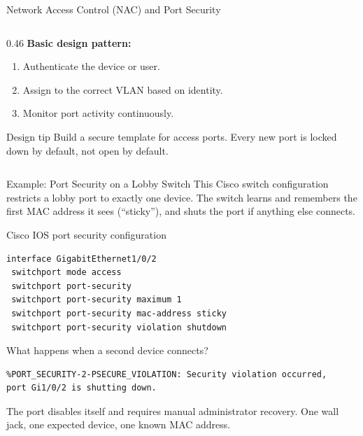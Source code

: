 \documentclass[aspectratio=169]{beamer}  %
\begin{document}
\begin{frame}{Network Access Control (NAC) and Port Security}
\begin{columns}[T]
\begin{column}{0.46\textwidth}
            \vspace{0.4em}
            \textbf{Basic design pattern:}
            \begin{enumerate}
                \item Authenticate the device or user.
                \item Assign to the correct VLAN based on identity.
                \item Monitor port activity continuously.
            \end{enumerate}

            \begin{exampleblock}{Design tip}
                \footnotesize
                Build a secure template for access ports. Every new port is locked down by default, not open by default.
            \end{exampleblock}
        \end{column}
    \end{columns}
\end{frame}

\begin{frame}[fragile]{Example: Port Security on a Lobby Switch}
    \footnotesize
    This Cisco switch configuration restricts a lobby port to exactly one device. The switch learns and remembers the first MAC address it sees (``sticky''), and shuts the port if anything else connects.

    \vspace{0.4em}
    \begin{exampleblock}{Cisco IOS port security configuration}
        \scriptsize
\begin{verbatim}
interface GigabitEthernet1/0/2
 switchport mode access
 switchport port-security
 switchport port-security maximum 1
 switchport port-security mac-address sticky
 switchport port-security violation shutdown
\end{verbatim}
    \end{exampleblock}

    \begin{alertblock}{What happens when a second device connects?}
        \scriptsize
\begin{verbatim}
%PORT_SECURITY-2-PSECURE_VIOLATION: Security violation occurred,
port Gi1/0/2 is shutting down.
\end{verbatim}
    \end{alertblock}

    \footnotesize
    The port disables itself and requires manual administrator recovery. One wall jack, one expected device, one known MAC address.
\end{frame}
\end{document}
